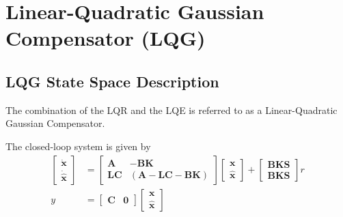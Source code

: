 \section{Linear-Quadratic Gaussian Compensator (LQG)}
\subsection{LQG State Space Description}

The combination of the LQR and the LQE is referred to as a Linear-Quadratic Gaussian Compensator.

\newpar{}

\begin{center}
    
\end{center}

The closed-loop system is given by
\begin{align*}
    \begin{bmatrix}
        \dot{\textbf{x}} \\
        \dot{\hat{\textbf{x}}}
    \end{bmatrix}
      & =
    \begin{bmatrix}
        \mathbf{A}  & - \mathbf{BK}                        \\
        \mathbf{LC} & (\mathbf{A}-\mathbf{LC}-\mathbf{BK})
    \end{bmatrix}
    \begin{bmatrix}
        \textbf{x} \\
        \hat{\textbf{x}}
    \end{bmatrix}
    +
    \begin{bmatrix}
        \mathbf{BKS} \\
        \mathbf{BKS}
    \end{bmatrix}
    r                             \\
    y & = \begin{bmatrix}
              \mathbf{C} & \mathbf{0}
          \end{bmatrix}
    \begin{bmatrix}
        \textbf{x} \\
        \hat{\textbf{x}}
    \end{bmatrix}
\end{align*}

